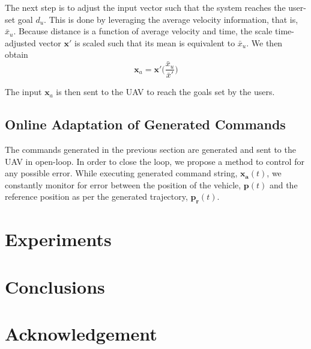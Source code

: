 \documentclass[letterpaper, 10 pt, conference]{ieeeconf}  %
\begin{document}
The next step is to adjust the input vector such that the system reaches the user-set goal $d_u$. This is done by leveraging the average velocity information, that is, $\bar{x}_u$. Because distance is a function of average velocity and time, the scale time-adjusted vector $\mathbf{x}'$ is scaled such that its mean is equivalent to $\bar{x}_u$. We then obtain
\begin{equation}
\mathbf{x}_a = \mathbf{x}'\bigg(\frac{\bar{x}_u}{\bar{x}'}\bigg)
\end{equation}

The input $\mathbf{x}_a$ is then sent to the UAV to reach the goals set by the users.


\subsection{Online Adaptation of Generated Commands}

The commands generated in the previous section are generated and sent to the UAV in open-loop. In order to close the loop, we propose a method to control for any possible error. While executing generated command string, $\mathbf{x_a}(t)$, we constantly monitor for error between the position of the vehicle, $\mathbf{p}(t)$ and the reference position as per the generated trajectory, $\mathbf{p_r}(t)$.


\section{Experiments}


\section{Conclusions}

\section{Acknowledgement}


\addtolength{\textheight}{-12cm}   %
\end{document}
